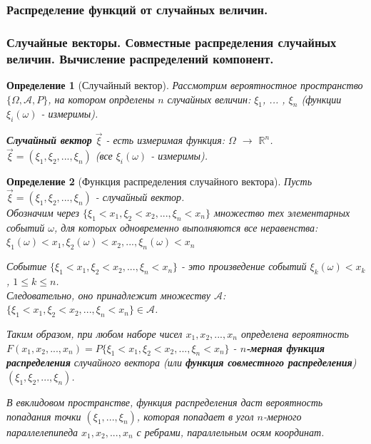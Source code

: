 \documentclass[14pt]{extarticle}
\theoremstyle{breakstyle}
\newtheorem{definition}{Определение}[subsection]
\begin{document}
\subsubsection{Распределение функций от случайных величин.}

\subsubsection{Случайные векторы. Совместные распределения случайных величин. Вычисление распределений компонент.}
\begin{definition}[Случайный вектор]

Рассмотрим вероятностное пространство $\{\Omega, \mathscr{A}, P\}$, на котором опрделены $n$ случайных величин: $\xi_{1}$, ... , $\xi_{n}$ (функции $\xi_{i}(\omega)$ - измеримы).

\vspace{\baselineskip}

\textbf{Случайный вектор} $\vec{\xi}$ - есть измеримая функция: $\Omega$ $\rightarrow$ $\mathbb{R}^{n}$. \\
$\vec{\xi} = (\xi_{1}, \xi_{2}, ... , \xi_{n})$ (все $\xi_{i}(\omega)$ - измеримы).

\end{definition}

\begin{definition}[Функция распределения случайного вектора]

Пусть $\vec{\xi} = (\xi_{1}, \xi_{2}, ... , \xi_{n})$ - случайный вектор. \\
Обозначим через $\{\xi_{1} < x_{1}, \xi_{2} < x_{2}, ... , \xi_{n} < x_{n}\}$ множество тех элементарных событий $\omega$, для которых одновременно выполняются все неравенства: $\xi_{1}(\omega) < x_{1}, \xi_{2}(\omega) < x_{2}, ..., \xi_{n}(\omega) < x_{n}$

\vspace{\baselineskip}

Событие $\{\xi_{1} < x_{1}, \xi_{2} < x_{2}, ... , \xi_{n} < x_{n}\}$ - это произведение событий $\xi_{k}(\omega) < x_{k}$, $1 \leq k \leq n$. \\
Следовательно, оно принадлежит множеству $\mathscr{A}$: $\{\xi_{1} < x_{1}, \xi_{2} < x_{2}, ... , \xi_{n} < x_{n}\} \in \mathscr{A}$.

\vspace{\baselineskip}

Таким образом, при любом наборе чисел $x_{1}, x_{2}, ..., x_{n}$ определена вероятность $F(x_{1}, x_{2}, ..., x_{n}) = P\{\xi_{1} < x_{1}, \xi_{2} < x_{2}, ... , \xi_{n} < x_{n}\}$ - \textbf{$n$-мерная функция распределения} случайного вектора (или \textbf{функция совместного распределения}) $(\xi_{1}, \xi_{2}, ..., \xi_{n})$.

\vspace{\baselineskip}

В евклидовом пространстве, функция распределения даст вероятность попадания точки $(\xi_{1}, ..., \xi_{n})$, которая попадает в угол $n$-мерного параллелепипеда $x_{1}, x_{2}, ..., x_{n}$ с ребрами, параллельным осям координат.

\end{definition}
\end{document}
